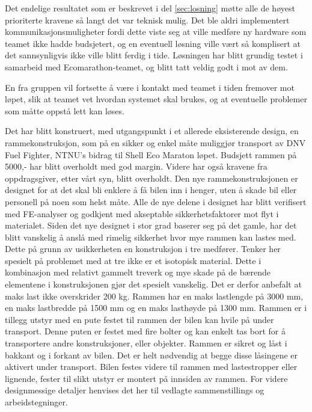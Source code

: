 Det endelige resultatet som er beskrevet i del \ref{sec:losning} møtte alle de høyest prioriterte kravene så langt det var teknisk mulig.
Det ble aldri implementert kommunikasjonsmuligheter fordi dette viste seg at ville medføre ny hardware som teamet ikke hadde budsjetert, og en eventuell løsning ville vært så komplisert at det sannsynligvis ikke ville blitt ferdig i tide.
Løsningen har blitt grundig testet i samarbeid med Ecomarathon-teamet, og blitt tatt veldig godt i mot av dem.

En fra gruppen vil fortsette å være i kontakt med teamet i tiden fremover mot løpet, slik at teamet vet hvordan systemet skal brukes, og at eventuelle problemer som måtte oppstå lett kan løses.

Det har blitt konstruert, med utgangspunkt i et allerede eksisterende design, en rammekonstruksjon, som på en sikker og enkel måte muliggjør transport av DNV Fuel Fighter, NTNU’s bidrag til Shell Eco Maraton løpet. Budsjett rammen på 5000,- har blitt overholdt med god margin. Videre har også kravene fra oppdragsgiver, etter vårt syn, blitt overholdt. Den nye rammekonstruksjonen er designet for at det skal bli enklere å få bilen inn i henger, uten å skade bil eller personell på noen som helst måte. 
Alle de nye delene i designet har blitt verifisert med FE-analyser og godkjent med akseptable sikkerhetsfaktorer mot flyt i materialet. 
Siden det nye designet i stor grad baserer seg på det gamle, har det blitt vanskelig å anslå med rimelig sikkerhet hvor mye rammen kan lastes med. Dette på grunn av usikkerheten en konstruksjon i tre medfører. Tenker her spesielt på problemet med at tre ikke er et isotopisk material. Dette i kombinasjon med relativt gammelt treverk og mye skade på de bærende elementene i konstruksjonen gjør det spesielt vanskelig. Det er derfor anbefalt at maks last ikke overskrider 200 kg. Rammen har en maks lastlengde på 3000 mm, en maks lastbredde på 1500 mm og en maks lasthøyde på 1300 mm. 
Rammen er i tillegg utstyr med en pute festet til rammen der bilen kan hvile på under transport. Denne puten er festet med fire bolter og kan enkelt tas bort for å transportere andre konstruksjoner, eller objekter. 
Rammen er sikret og låst i bakkant og i forkant av bilen. Det er helt nødvendig at begge disse låsingene er aktivert under transport. Bilen festes videre til rammen med lastestropper eller lignende, fester til slikt utstyr er montert på innsiden av rammen. For videre designmessige detaljer henvises det her til vedlagte sammenstillings og arbeidstegninger.

 

